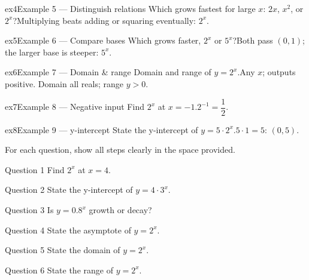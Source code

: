 \documentclass[11pt]{article}
\begin{document}
\begin{example}{ex4}{Example 5 --- Distinguish relations}
Which grows fastest for large $x$: $2x$, $x^2$, or $2^x$?\soln Multiplying beats adding or squaring eventually: $2^x$.
\end{example}

\begin{example}{ex5}{Example 6 --- Compare bases}
Which grows faster, $2^x$ or $5^x$?\soln Both pass $(0,1)$; the larger base is steeper: $5^x$.
\end{example}

\begin{example}{ex6}{Example 7 --- Domain \& range}
Domain and range of $y=2^x$.\soln Any $x$; outputs positive. Domain all reals; range $y>0$.
\end{example}

\begin{example}{ex7}{Example 8 --- Negative input}
Find $2^x$ at $x=-1$.\soln $2^{-1}=\dfrac12$.
\end{example}

\begin{example}{ex8}{Example 9 --- y-intercept}
State the y-intercept of $y=5\cdot2^x$.\soln $5\cdot1=5$: $(0,5)$.
\end{example}

\clearpage
{}
For each question, show all steps clearly in the space provided.

\begin{qbox}{Question 1}
Find $2^x$ at $x=4$.\workspace{2.4cm}
\end{qbox}

\begin{qbox}{Question 2}
State the y-intercept of $y=4\cdot3^x$.\workspace{2.4cm}
\end{qbox}

\begin{qbox}{Question 3}
Is $y=0.8^x$ growth or decay?\workspace{2.4cm}
\end{qbox}

\begin{qbox}{Question 4}
State the asymptote of $y=2^x$.\workspace{2.4cm}
\end{qbox}

\begin{qbox}{Question 5}
State the domain of $y=2^x$.\workspace{2.4cm}
\end{qbox}

\begin{qbox}{Question 6}
State the range of $y=2^x$.\workspace{2.4cm}
\end{qbox}
\end{document}
